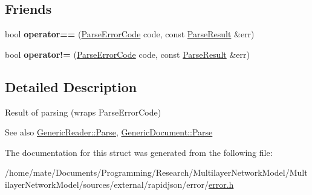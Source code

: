 \subsection*{Friends}
\begin{DoxyCompactItemize}
\item 
bool {\bfseries operator==} (\hyperlink{group__RAPIDJSON__ERRORS_ga8d4b32dfc45840bca189ade2bbcb6ba7}{Parse\+Error\+Code} code, const \hyperlink{structParseResult}{Parse\+Result} \&err)\hypertarget{structParseResult_a58c9982e833d1c74686506ac7449200c}{}\label{structParseResult_a58c9982e833d1c74686506ac7449200c}

\item 
bool {\bfseries operator!=} (\hyperlink{group__RAPIDJSON__ERRORS_ga8d4b32dfc45840bca189ade2bbcb6ba7}{Parse\+Error\+Code} code, const \hyperlink{structParseResult}{Parse\+Result} \&err)\hypertarget{structParseResult_a0498aebcfdd3d4a5dcb989ee29b93d4d}{}\label{structParseResult_a0498aebcfdd3d4a5dcb989ee29b93d4d}

\end{DoxyCompactItemize}


\subsection{Detailed Description}
Result of parsing (wraps Parse\+Error\+Code) 


 \begin{DoxySeeAlso}{See also}
\hyperlink{classGenericReader_a0c450620d14ff1824e58bb7bd9b42099}{Generic\+Reader\+::\+Parse}, \hyperlink{classGenericDocument_aadee36db7064cc9894a75c848831cdae}{Generic\+Document\+::\+Parse} 
\end{DoxySeeAlso}


The documentation for this struct was generated from the following file\+:\begin{DoxyCompactItemize}
\item 
/home/mate/\+Documents/\+Programming/\+Research/\+Multilayer\+Network\+Model/\+Multilayer\+Network\+Model/sources/external/rapidjson/error/\hyperlink{error_8h}{error.\+h}\end{DoxyCompactItemize}
